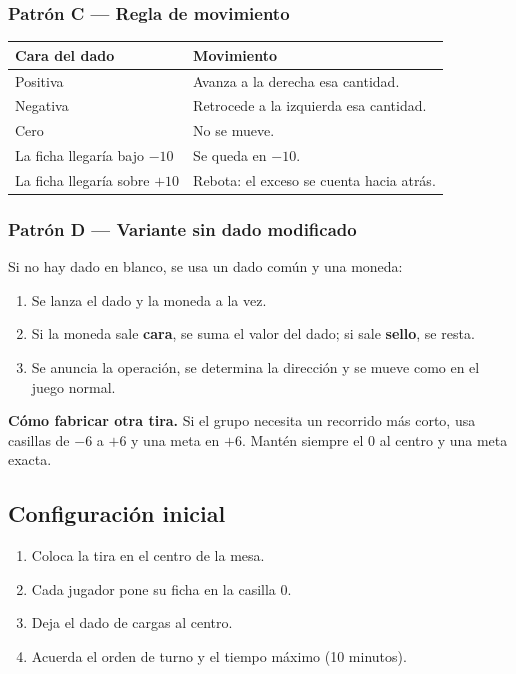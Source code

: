 \documentclass[12pt, letterpaper]{article}
\begin{document}
\subsubsection{Patrón C — Regla de movimiento}

\begin{center}
\small
\begin{tabular}{@{}p{5.4cm} p{8.8cm}@{}}
\toprule
\textbf{Cara del dado} & \textbf{Movimiento}\\
\midrule
Positiva & Avanza a la derecha esa cantidad.\\
Negativa & Retrocede a la izquierda esa cantidad.\\
Cero & No se mueve.\\
La ficha llegaría bajo $-10$ & Se queda en $-10$.\\
La ficha llegaría sobre $+10$ & Rebota: el exceso se cuenta hacia atrás.\\
\bottomrule
\end{tabular}
\end{center}

\subsubsection{Patrón D — Variante sin dado modificado}

Si no hay dado en blanco, se usa un dado común y una moneda:

\begin{enumerate}[leftmargin=*]
  \item Se lanza el dado y la moneda a la vez.
  \item Si la moneda sale \textbf{cara}, se suma el valor del dado; si sale \textbf{sello}, se resta.
  \item Se anuncia la operación, se determina la dirección y se mueve como en el juego normal.
\end{enumerate}

\begin{cuadroadvertencia}
\textbf{Cómo fabricar otra tira.} Si el grupo necesita un recorrido más corto, usa casillas de $-6$ a $+6$ y una meta en $+6$. Mantén siempre el $0$ al centro y una meta exacta.
\end{cuadroadvertencia}

\subsection{Configuración inicial}

\begin{enumerate}[leftmargin=*]
  \item Coloca la tira en el centro de la mesa.
  \item Cada jugador pone su ficha en la casilla $0$.
  \item Deja el dado de cargas al centro.
  \item Acuerda el orden de turno y el tiempo máximo (10 minutos).
\end{enumerate}
\end{document}
